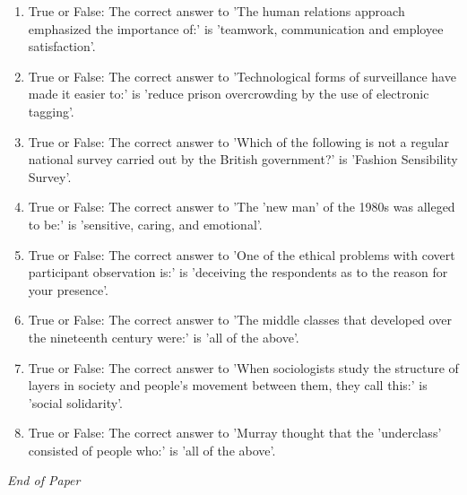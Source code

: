 \documentclass[12pt]{article}
\begin{document}
\begin{enumerate}[label=\arabic*.]
\item True or False: The correct answer to 'The human relations approach emphasized the importance of:' is 'teamwork, communication and employee satisfaction'.
\item True or False: The correct answer to 'Technological forms of surveillance have made it easier to:' is 'reduce prison overcrowding by the use of electronic tagging'.
\item True or False: The correct answer to 'Which of the following is not a regular national survey carried out by the British government?' is 'Fashion Sensibility Survey'.
\item True or False: The correct answer to 'The 'new man' of the 1980s was alleged to be:' is 'sensitive, caring, and emotional'.
\item True or False: The correct answer to 'One of the ethical problems with covert participant observation is:' is 'deceiving the respondents as to the reason for your presence'.
\item True or False: The correct answer to 'The middle classes that developed over the nineteenth century were:' is 'all of the above'.
\item True or False: The correct answer to 'When sociologists study the structure of layers in society and people's movement between them, they call this:' is 'social solidarity'.
\item True or False: The correct answer to 'Murray thought that the 'underclass' consisted of people who:' is 'all of the above'.
\end{enumerate}

\vfill
\noindent\textit{End of Paper}
\end{document}
